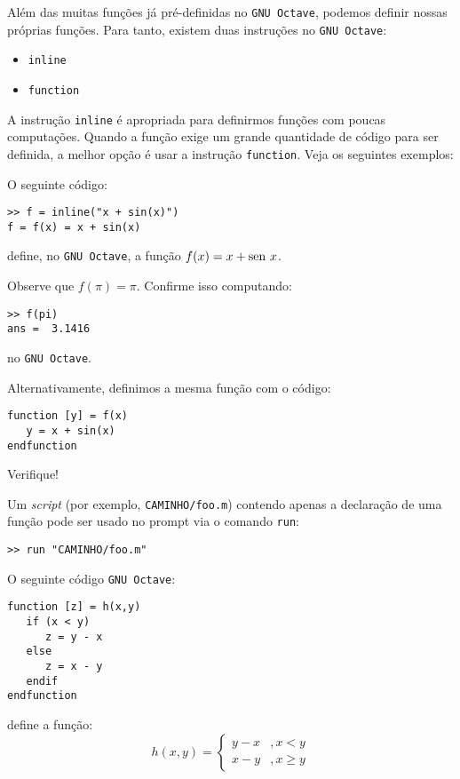 Além das muitas funções já pré-definidas no \verb+GNU Octave+, podemos definir nossas próprias funções. Para tanto, existem duas instruções no \verb+GNU Octave+:
\begin{itemize}
\item \verb+inline+
\item \verb+function+
\end{itemize}

A instrução \verb+inline+ é apropriada para definirmos funções com poucas computações. Quando a função exige um grande quantidade de código para ser definida, a melhor opção é usar a instrução \verb+function+. Veja os seguintes exemplos:

\begin{ex}
  O seguinte código:
\begin{verbatim}
>> f = inline("x + sin(x)")
f = f(x) = x + sin(x)
\end{verbatim}
define, no \verb+GNU Octave+, a função $f(x) = x + \operatorname{sen}\, x$.

Observe que $f(\pi) = \pi$. Confirme isso computando:
\begin{verbatim}
>> f(pi)
ans =  3.1416
\end{verbatim}
no \verb+GNU Octave+.

Alternativamente, definimos a mesma função com o código:
\begin{verbatim}
function [y] = f(x)
   y = x + sin(x)
endfunction
\end{verbatim}
Verifique!
\end{ex}

\begin{obs}
  Um {\it script} (por exemplo, \verb+CAMINHO/foo.m+) contendo apenas a declaração de uma função pode ser usado no prompt via o comando \verb+run+:
\begin{verbatim}
>> run "CAMINHO/foo.m"
\end{verbatim}
\end{obs}

\begin{ex}
  O seguinte código \verb+GNU Octave+:
\begin{verbatim}
function [z] = h(x,y)
   if (x < y)
      z = y - x
   else
      z = x - y
   endif
endfunction
\end{verbatim}
define a função:
\begin{equation*}
  h(x,y) = \left\{
    \begin{array}{ll}
      y - x &, x < y\\
      x - y &, x \geq y
    \end{array}
\right.
\end{equation*}
\end{ex}

